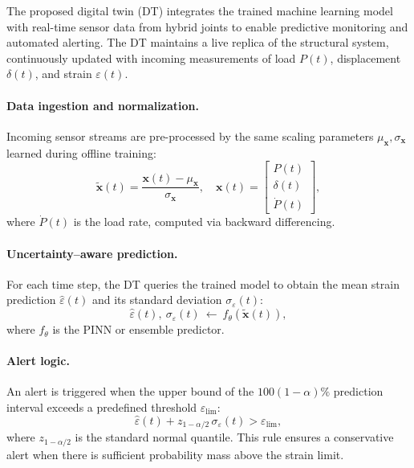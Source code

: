 \documentclass{article}
\begin{document}
The proposed digital twin (DT) integrates the trained machine learning model with real-time sensor data from hybrid joints to enable predictive monitoring and automated alerting. The DT maintains a live replica of the structural system, continuously updated with incoming measurements of load $P(t)$, displacement $\delta(t)$, and strain $\varepsilon(t)$.

\paragraph{Data ingestion and normalization.}
Incoming sensor streams are pre-processed by the same scaling parameters $\mu_{\mathbf{x}}, \sigma_{\mathbf{x}}$ learned during offline training:
\begin{equation}
\label{eq:dt-scaling}
\tilde{\mathbf{x}}(t) = \frac{\mathbf{x}(t) - \mu_{\mathbf{x}}}{\sigma_{\mathbf{x}}}, 
\quad \mathbf{x}(t) = \begin{bmatrix} P(t) \\ \delta(t) \\ \dot{P}(t) \end{bmatrix},
\end{equation}
where $\dot{P}(t)$ is the load rate, computed via backward differencing.

\paragraph{Uncertainty–aware prediction.}
For each time step, the DT queries the trained model to obtain the mean strain prediction $\hat{\varepsilon}(t)$ and its standard deviation $\sigma_{\varepsilon}(t)$:
\begin{equation}
\label{eq:dt-prediction}
\hat{\varepsilon}(t),\ \sigma_{\varepsilon}(t) \ \leftarrow \ f_{\theta}(\tilde{\mathbf{x}}(t)),
\end{equation}
where $f_{\theta}$ is the PINN or ensemble predictor.

\paragraph{Alert logic.}
An alert is triggered when the upper bound of the $100(1-\alpha)\%$ prediction interval exceeds a predefined threshold $\varepsilon_{\mathrm{lim}}$:
\begin{equation}
\label{eq:dt-alert}
\hat{\varepsilon}(t) + z_{1-\alpha/2}\,\sigma_{\varepsilon}(t) > \varepsilon_{\mathrm{lim}},
\end{equation}
where $z_{1-\alpha/2}$ is the standard normal quantile. This rule ensures a conservative alert when there is sufficient probability mass above the strain limit.
\end{document}
